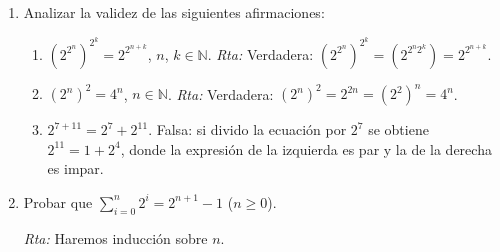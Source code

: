 \documentclass[a4paper,12pt,twoside,spanish,reqno]{amsbook}
\numberwithin{equation}{section}
\newcommand{\rta}{\noindent\textit{Rta: }}
\begin{document}
\begin{enumerate}
\begin{enumerate}
                
                \item $(x^n)^m = x^{n\cdot m}$
                
                \rta Al igual que en \textit{a)}, se fijará $n$ y se hará inducción sobre $m$.
                
                \noindent(\it Caso  base\rm) Debemos ver que $(x^n)^1 = x^n$, lo cual es verdadero por la definición recursiva de potencia. 
                
                \noindent ({\it Paso  inductivo}) Supongamos que el resultado es verdadero para $m=k$, es decir que  $(x^n)^k = x^{nk}$ (HI). Veamos que  $(x^n)^{k+1} = x^{n(k+1)}$. 
                \begin{equation*}
                (x^n)^{k+1}  \overset{\text{def}}{=} (x^n)^{k}x^n
                \overset{\text{(HI)}}{=} x^{nk}x^n
                \overset{\text{(\textit{a)}}}{=} x^{nk+n} 
                = x^{n(k+1)}.  
                \end{equation*} 
            \end{enumerate}
        
        
        
        
        
        \item Analizar la validez de las siguientes afirmaciones:
        \begin{enumerate}
            \item  $(2^{2^n})^{2^k} = 2^{2^{n+k}}$,  $n$, $k \in {\mathbb N}$.     \rta  Verdadera: $(2^{2^n})^{2^k} =(2^{2^n2^k}) =  2^{2^{n+k}}$.
            \item $(2^n)^2 = 4^n$, $n \in {\mathbb N}$. \rta  Verdadera: $(2^n)^2 = 2^{2n} =(2^2)^n= 4^n$.
            \item $2^{7+11} = 2^7 + 2^{11}$. Falsa: si divido la ecuación por $2^7$ se obtiene $2^{11} = 1 + 2^{4}$,  donde la expresión de la izquierda es par y la de la derecha es impar. 
        \end{enumerate}
        
        
        
        \item\label{ej-suma-2-ala-n} Probar que $\sum_{i=0}^n 2^i = 2^{n+1} -1$ ($n \ge 0$). 
        
        \rta Haremos inducción sobre $n$. 
        

\end{enumerate}
\end{document}
